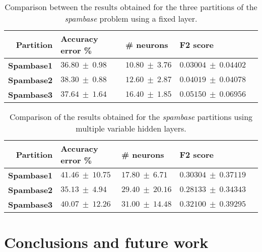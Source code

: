 \documentclass[runningheads]{llncs}
\begin{document}
\begin{table}
    \centering
    \caption{
        Comparison between the results obtained for the three partitions of the
        \emph{spambase} problem using a fixed layer. %
    }
    \label{tab:spambase-onelayer}
    \begin{tabular}{r|l|l|l|l}
        \textbf{Partition} & \textbf{Accuracy error \%} & \textbf{\# neurons} & \textbf{F2 score} \\
        \hline
        \textbf{Spambase1}   & $36.80\ \pm\ 0.98$ & $10.80\ \pm\ 3.76$ & $0.03004\ \pm\ 0.04402$ \\
        \textbf{Spambase2}   & $38.30\ \pm\ 0.88$ & $12.60\ \pm\ 2.87$ & $0.04019\ \pm\ 0.04078$ \\
        \textbf{Spambase3}   & $37.64\ \pm\ 1.64$ & $16.40\ \pm\ 1.85$ & $0.05150\ \pm\ 0.06956$ \\
    \end{tabular}
\end{table}

\begin{table}
    \centering
    \caption{
        Comparison of the results obtained for the \emph{spambase} partitions
        using multiple variable hidden layers.
    }
    \label{tab:spambase-onelayer}
    \begin{tabular}{r|l|l|l|l}
        \textbf{Partition} & \textbf{Accuracy error \%} & \textbf{\# neurons} & \textbf{F2 score} \\
        \hline
        \textbf{Spambase1}   & $41.46\ \pm\ 10.75$ & $17.80\ \pm\ 6.71$ & $0.30304\ \pm\ 0.37119$ \\
        \textbf{Spambase2}   & $35.13\ \pm\ 4.94$ & $29.40\ \pm\ 20.16$ & $0.28133\ \pm\ 0.34343$ \\
        \textbf{Spambase3}   & $40.07\ \pm\ 12.26$ & $31.00\ \pm\ 14.48$ & $0.32100\ \pm\ 0.39295$ \\
    \end{tabular}
\end{table}


\section{Conclusions and future work}
\label{sec:conclus}
\end{document}
